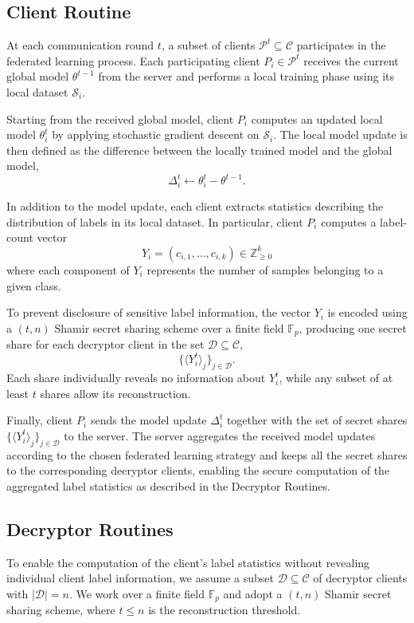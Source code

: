 \documentclass[runningheads]{llncs}
\begin{document}
\subsection{Client Routine}

At each communication round $t$, a subset of clients $\mathcal{P}^t \subseteq \mathcal{C}$
participates in the federated learning process.
Each participating client $P_i \in \mathcal{P}^t$ receives the current global model $\theta^{t-1}$ from the server and performs a local training phase using its local dataset
$\mathcal{S}_i$.

Starting from the received global model, client $P_i$ computes an updated local model $\theta_i^t$ by applying stochastic gradient descent on $\mathcal{S}_i$.
The local model update is then defined as the difference between the locally trained model and the global model,
\[
\Delta_i^t \leftarrow \theta_i^t - \theta^{t-1}.
\]

In addition to the model update, each client extracts statistics describing the distribution of labels in its local dataset.
In particular, client $P_i$ computes a label-count vector
\[
Y_i = (c_{i,1},\dots,c_{i,k}) \in \mathbb{Z}_{\ge 0}^k
\]
where each component of $Y_i$ represents the number of samples belonging to a given class.

To prevent disclosure of sensitive label information, the vector $Y_i$ is encoded using a $(t,n)$ Shamir secret sharing scheme over a finite field
$\mathbb{F}_p$, producing one secret share for each decryptor client in the set
$\mathcal{D} \subseteq \mathcal{C}$,
\[
\{\langle Y_i^t \rangle_j\}_{j \in \mathcal{D}}.
\]
Each share individually reveals no information about $Y_i^t$, while any subset of at least
$t$ shares allow its reconstruction.

Finally, client $P_i$ sends the model update $\Delta_i^t$ together with the set of secret shares $\{\langle Y_i^t \rangle_j\}_{j \in \mathcal{D}}$ to the server.
The server aggregates the received model updates according to the chosen federated learning strategy and keeps all the secret shares to the corresponding decryptor clients, enabling the secure computation of the aggregated label statistics as described in the Decryptor Routines.

\subsection{Decryptor Routines}
To enable the computation of the client's label statistics without revealing individual client
label information, we assume a subset $\mathcal{D} \subseteq \mathcal{C}$ of
decryptor clients with $|\mathcal{D}| = n$.
We work over a finite field $\mathbb{F}_p$ and adopt a $(t,n)$ Shamir secret sharing scheme,
where $t \le n$ is the reconstruction threshold.
\end{document}
